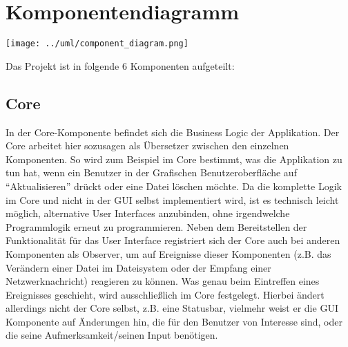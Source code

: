 \section{Komponentendiagramm}

\texttt{[image: ../uml/component\_diagram.png]}

Das Projekt ist in folgende 6 Komponenten aufgeteilt:





\subsection{Core}
In der Core-Komponente befindet sich die Business Logic der Applikation. Der Core arbeitet hier sozusagen als Übersetzer zwischen den einzelnen Komponenten. So wird zum Beispiel im Core bestimmt, was die Applikation zu tun hat, wenn ein Benutzer in der Grafischen Benutzeroberfläche auf ``Aktualisieren'' drückt oder eine Datei löschen möchte. Da die komplette Logik im Core und nicht in der GUI selbst implementiert wird, ist es technisch leicht möglich, alternative User Interfaces anzubinden, ohne irgendwelche Programmlogik erneut zu programmieren.
Neben dem Bereitstellen der Funktionalität für das User Interface registriert sich der Core auch bei anderen Komponenten als Observer, um auf Ereignisse dieser Komponenten (z.B. das Verändern einer Datei im Dateisystem oder der Empfang einer Netzwerknachricht) reagieren zu können. Was genau beim Eintreffen eines Ereignisses geschieht, wird ausschließlich im Core festgelegt. Hierbei ändert allerdings nicht der Core selbst, z.B. eine Statusbar, vielmehr weist er die GUI Komponente auf Änderungen hin, die für den Benutzer von Interesse sind, oder die seine Aufmerksamkeit/seinen Input benötigen.

